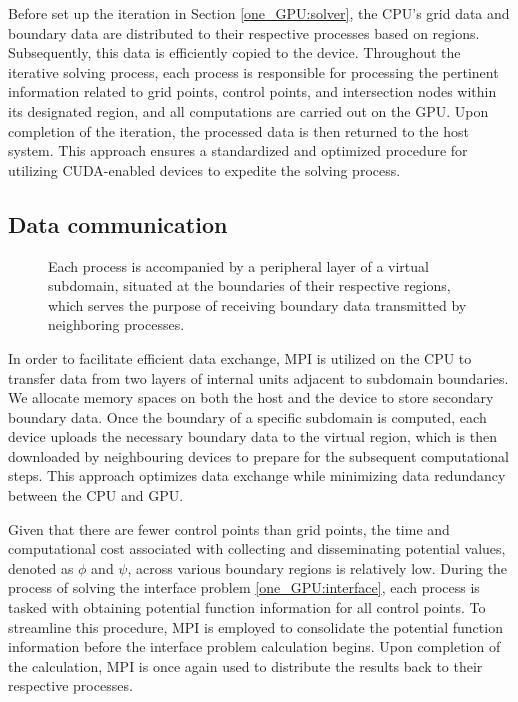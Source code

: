 Before set up the iteration in Section \ref{one_GPU:solver}, the CPU's grid data and boundary data are distributed to their respective processes based on regions. Subsequently, this data is efficiently copied to the device. Throughout the iterative solving process, each process is responsible for processing the pertinent information related to grid points, control points, and intersection nodes within its designated region, and all computations are carried out on the GPU. Upon completion of the iteration, the processed data is then returned to the host system. This approach ensures a standardized and optimized procedure for utilizing CUDA-enabled devices to expedite the solving process.

\subsection{Data communication}
\begin{figure}[ht]
    \caption{Each process is accompanied by a peripheral layer of a virtual subdomain, situated at the boundaries of their respective regions, which serves the purpose of receiving boundary data transmitted by neighboring processes.}
\end{figure}

In order to facilitate efficient data exchange, MPI is utilized on the CPU to transfer data from two layers of internal units adjacent to subdomain boundaries. We allocate memory spaces on both the host and the device to store secondary boundary data. Once the boundary of a specific subdomain is computed, each device uploads the necessary boundary data to the virtual region, which is then downloaded by neighbouring devices to prepare for the subsequent computational steps. This approach optimizes data exchange while minimizing data redundancy between the CPU and GPU.

Given that there are fewer control points than grid points, the time and computational cost associated with collecting and disseminating potential values, denoted as $\phi$ and $\psi$, across various boundary regions is relatively low. During the process of solving the interface problem \eqref{one_GPU:interface}, each process is tasked with obtaining potential function information for all control points. To streamline this procedure, MPI is employed to consolidate the potential function information before the interface problem calculation begins. Upon completion of the calculation, MPI is once again used to distribute the results back to their respective processes. 

